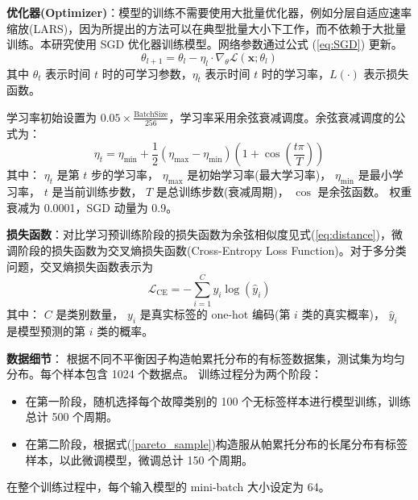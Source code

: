 \documentclass[master]{thesis-uestc}
\begin{document}
\textbf{优化器(Optimizer)}：模型的训练不需要使用大批量优化器，例如分层自适应速率缩放(LARS)，因为所提出的方法可以在典型批量大小下工作，而不依赖于大批量训练。本研究使用 SGD 优化器训练模型。网络参数通过公式 (\ref{eq:SGD}) 更新。
\begin{equation}
    \theta_{l+1} = \theta_l - \eta_l \cdot \nabla_{\theta} \mathcal{L}(\mathbf{x}; \theta_l)
\label{eq:SGD}
\end{equation}
其中 \( \theta_t \) 表示时间 \( t \) 时的可学习参数，\( \eta_t \) 表示时间 \( t \) 时的学习率，\( L(\cdot) \) 表示损失函数。

学习率初始设置为 \( 0.05 \times \frac{\text{BatchSize}}{256} \)，学习率采用余弦衰减调度。余弦衰减调度的公式为：
\begin{equation}
    \eta_t = \eta_{\text{min}} + \frac{1}{2} (\eta_{\text{max}} - \eta_{\text{min}}) \left(1 + \cos\left(\frac{t \pi}{T}\right)\right)
    \label{eq:cos_decay}
\end{equation}
    其中：
        \(\eta_t\) 是第 \(t\) 步的学习率，
        \(\eta_{\text{max}}\) 是初始学习率(最大学习率)，
        \(\eta_{\text{min}}\) 是最小学习率，
        \(t\) 是当前训练步数，
        \(T\) 是总训练步数(衰减周期)，
        \(\cos\) 是余弦函数。
    权重衰减为 0.0001，SGD 动量为 0.9。

\textbf{损失函数}：对比学习预训练阶段的损失函数为余弦相似度见式(\ref{eq:distance})，微调阶段的损失函数为交叉熵损失函数(Cross-Entropy Loss Function)。对于多分类问题，交叉熵损失函数表示为
\begin{equation}
    \mathcal{L}_{\text{CE}} = -\sum_{i=1}^{C} y_i \log(\hat{y}_i)
    \label{eq:cross_entropy}
    \end{equation}        
    其中：
        \( C \) 是类别数量，
        \( y_i \) 是真实标签的 one-hot 编码(第 \( i \) 类的真实概率)，
        \( \hat{y}_i \) 是模型预测的第 \( i \) 类的概率。

\textbf{数据细节}：
根据不同不平衡因子构造帕累托分布的有标签数据集，测试集为均匀分布。每个样本包含 1024 个数据点。
    训练过程分为两个阶段：
    \begin{itemize}
        \item 在第一阶段，随机选择每个故障类别的 100 个无标签样本进行模型训练，训练总计 500 个周期。
        \item 在第二阶段，根据式(\ref{pareto_sample})构造服从帕累托分布的长尾分布有标签样本，以此微调模型，微调总计 150 个周期。
    \end{itemize}
    在整个训练过程中，每个输入模型的 mini-batch 大小设定为 64。
\end{document}
